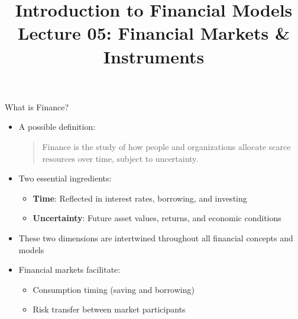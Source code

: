 \documentclass[10pt]{beamer}
\title{Introduction to Financial Models\\Lecture 05: Financial Markets \& Instruments}
\author{}
\date{}
\begin{document}
\begin{frame}
\titlepage
\end{frame}

\begin{frame}{What is Finance?}
  \begin{itemize}[<+->]
    \item A possible definition:
    \begin{quote}
      Finance is the study of how people and organizations allocate scarce resources over time, subject to uncertainty.
    \end{quote}
    \item Two essential ingredients:
      \begin{itemize}
        \item \textbf{Time}: Reflected in interest rates, borrowing, and investing
        \item \textbf{Uncertainty}: Future asset values, returns, and economic conditions
      \end{itemize}
    \item These two dimensions are intertwined throughout all financial concepts and models
    \item Financial markets facilitate:
      \begin{itemize}
        \item Consumption timing (saving and borrowing)
        \item Risk transfer between market participants
      \end{itemize}
  \end{itemize}
\end{frame}
\end{document}
